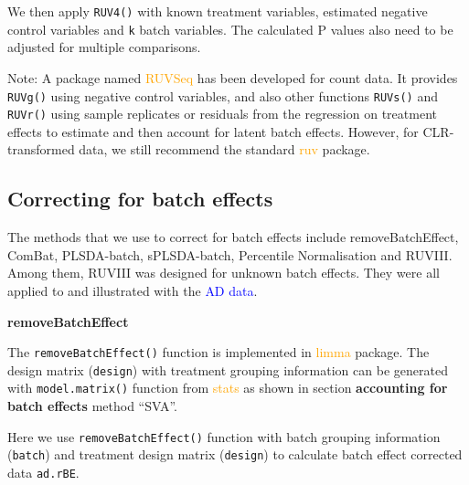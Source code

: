 \documentclass[
]{book}
\newenvironment{Shaded}{\begin{snugshade}}{\end{snugshade}}
\newcommand{\AttributeTok}[1]{\textcolor[rgb]{0.77,0.63,0.00}{#1}}
\newcommand{\CommentTok}[1]{\textcolor[rgb]{0.56,0.35,0.01}{\textit{#1}}}
\newcommand{\FunctionTok}[1]{\textcolor[rgb]{0.00,0.00,0.00}{#1}}
\newcommand{\NormalTok}[1]{#1}
\newcommand{\OtherTok}[1]{\textcolor[rgb]{0.56,0.35,0.01}{#1}}
\newcommand{\SpecialCharTok}[1]{\textcolor[rgb]{0.00,0.00,0.00}{#1}}
\newcommand{\StringTok}[1]{\textcolor[rgb]{0.31,0.60,0.02}{#1}}
\begin{document}
We then apply \texttt{RUV4()} with known treatment variables, estimated negative control variables and \texttt{k} batch variables. The calculated P values also need to be adjusted for multiple comparisons.

\begin{Shaded}
\end{Shaded}

Note: A package named \textcolor{orange}{RUVSeq} has been developed for count data. It provides \texttt{RUVg()} using negative control variables, and also other functions \texttt{RUVs()} and \texttt{RUVr()} using sample replicates \citep{moskovicz2020skin} or residuals from the regression on treatment effects to estimate and then account for latent batch effects. However, for CLR-transformed data, we still recommend the standard \textcolor{orange}{ruv} package.

\hypertarget{corrct}{%
\subsection{Correcting for batch effects}\label{corrct}}

The methods that we use to correct for batch effects include removeBatchEffect, ComBat, PLSDA-batch, sPLSDA-batch, Percentile Normalisation and RUVIII. Among them, RUVIII was designed for unknown batch effects. They were all applied to and illustrated with the \textcolor{blue}{AD data}.

\textbf{removeBatchEffect}

The \texttt{removeBatchEffect()} function is implemented in \textcolor{orange}{limma} package. The design matrix (\texttt{design}) with treatment grouping information can be generated with \texttt{model.matrix()} function from \textcolor{orange}{stats} as shown in section \textbf{accounting for batch effects} method ``SVA''.

Here we use \texttt{removeBatchEffect()} function with batch grouping information (\texttt{batch}) and treatment design matrix (\texttt{design}) to calculate batch effect corrected data \texttt{ad.rBE}.
\end{document}
